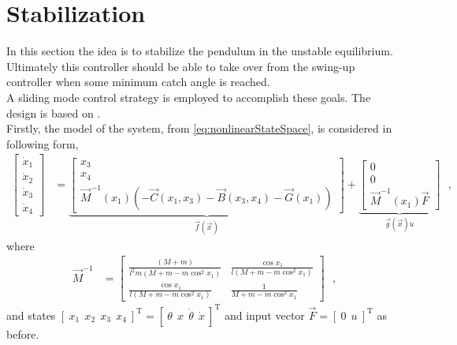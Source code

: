 \chapter{Stabilization}
In this section the idea is to stabilize the pendulum in the unstable equilibrium. Ultimately this controller should be able to take over from the swing-up controller when some minimum catch angle is reached.\\
A sliding mode control strategy is employed to accomplish these goals. The design is based on \cite{HKKhalil}.\\
Firstly, the model of the system, from \autoref{eq:nonlinearStateSpace}, is considered in following form,
\begin{align}
  \begin{bmatrix}
    \dot{x}_1 \\
    \dot{x}_2 \\
    \dot{x}_3 \\
    \dot{x}_4
  \end{bmatrix}
  &=
  \underbrace{
    \begin{bmatrix}
      x_3 \\
      x_4 \\
      \vec{M}^{-1}(x_1) ( - \vec{C}(x_1,x_3) - \vec{B}(x_3,x_4) - \vec{G}(x_1) )
    \end{bmatrix}
  }_{\vec{f}(\vec{x})}
  +
  \underbrace{ 
    \begin{bmatrix}
      0 \\
      0 \\
      \vec{M}^{-1}(x_1) \vec{F} 
    \end{bmatrix}
  }_{\vec{g}(\vec{x}) u}
  \label{eq:nonlinearStateSpace2} \ \ \ ,
\end{align}
where
\begin{align}
  \vec{M}^{-1}
  &=
  \begin{bmatrix}
    \frac{(M + m)}{l^2 m ( M + m - m \cos^2 x_1 )}  &  \frac{\cos x_1}{l (M + m - m \cos^2 x_1)} \\
    \frac{\cos x_1}{l (M + m - m \cos^2 x_1)}       &  \frac{1}{M + m - m \cos^2 x_1}
  \end{bmatrix}  \ \ \ ,
\end{align}
%
and states $ [\ x_1\ \ x_2\ \ x_3\ \ x_4\ ]^\mathrm{T} = [\ \theta\ \ x\ \ \dot{\theta}\ \ \dot{x}\ ]^\mathrm{T} $ and input vector $\vec{F} = [\ 0 \ \ u \ ]^\mathrm{T}$ as before.

